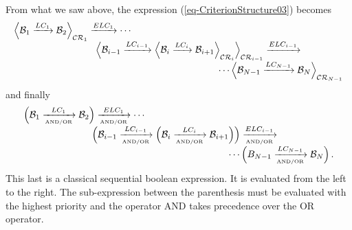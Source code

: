 \documentclass[a4paper,11pt] {article}
\begin{document}
From what we saw above, the expression (\ref{eq-CriterionStructure03}) becomes
\begin{equation}
\begin{array}{l}
\displaystyle \Big \langle \mathcal B_1 \xrightarrow{LC_1}  \mathcal B_2 \Big \rangle_{\mathcal{CR}_1} 
\xrightarrow{ELC_1}  \cdots \\
\displaystyle \hspace{3cm} \Big \langle \mathcal B_{i-1}  \xrightarrow{LC_{i-1}} \Big \langle \mathcal B_i 
 \xrightarrow{LC_i} \mathcal B_{i+1} \Big \rangle_{\mathcal{CR}_i} \Big \rangle_{\mathcal{CR}_{i-1}}  \xrightarrow{ELC_{i-1}}  \\
\displaystyle \hspace{7.5cm} \cdots  \Big \langle  \mathcal B_{N-1}   \xrightarrow{LC_{N-1}} \mathcal B_N  \Big \rangle_{\mathcal{CR}_{N-1}}
\end{array}
\end{equation}
and finally
\begin{equation}
\begin{array}{l}
\displaystyle \Big ( \mathcal B_1 \xrightarrow[{\mbox{\tiny AND/OR}}]{LC_1}  \mathcal B_2 \Big ) \xrightarrow[{\mbox{\tiny AND/OR}}]{ELC_1}  \cdots \\
\displaystyle \hspace{2.5cm} \Big ( \mathcal B_{i-1} \xrightarrow[{\mbox{\tiny AND/OR}}]{LC_{i-1}} \Big (
\mathcal B_i \xrightarrow[{\mbox{\tiny AND/OR}}]{LC_i} \mathcal B_{i+1} \Big) \Big )  \xrightarrow[{\mbox{\tiny AND/OR}}]{ELC_{i-1}}  \\
\displaystyle  \hspace{7.5cm}  \cdots \Big (   B_{N-1}   \xrightarrow[{\mbox{\tiny AND/OR}}]{LC_{N-1}} \mathcal B_N \Big ) \,. \\
\end{array}
\end{equation}
This last is a classical sequential boolean expression. It is evaluated from the left to the right.
The sub-expression between the parenthesis must be evaluated with the highest priority and the
operator AND takes precedence over the OR operator.
\end{document}
